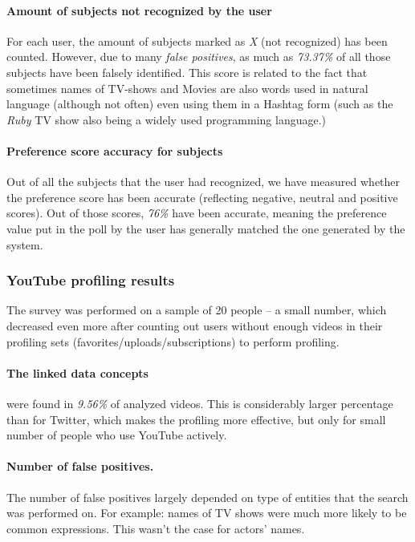\paragraph{Amount of subjects not recognized by the user}
For each user, the amount of subjects marked as \textit{X} (not recognized) has been counted. However, due to many
\textit{false positives}, as much as \textit{73.37\%} of all those subjects have been falsely identified. This score is
related to the fact that sometimes names of TV-shows and Movies are also words used in natural language (although not
often) even using them in a Hashtag form (such as the \textit{Ruby} TV show also being a widely used programming language.)

\paragraph{Preference score accuracy for subjects}
Out of all the subjects that the user had recognized, we have measured whether the preference score has been accurate
(reflecting negative, neutral and positive scores). Out of those scores, \textit{76\%} have been accurate, meaning
the preference value put in the poll by the user has generally matched the one generated by the system.

\subsubsection{YouTube profiling results}

The survey was performed on a sample of 20 people -- a small number, which
decreased even more after counting out users without enough videos in their
profiling sets (favorites/uploads/subscriptions) to perform profiling.

\paragraph{The linked data concepts} were found in \textit{9.56\%} of analyzed videos. This
is considerably larger percentage than for Twitter, which makes the profiling
more effective, but only for small number of people who use YouTube actively.

\paragraph{Number of false positives.} The number of false positives largely
depended on type of entities that the search was performed on. For example:
names of TV shows were much more likely to be common expressions. This wasn't
the case for actors' names.
